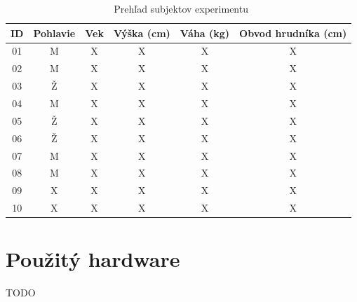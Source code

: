 \begin{table}[H]\centering
\caption[Prehľad subjektov experimentu]{~Prehľad subjektov experimentu}\label{tab:subjects}
    \begin{tabular}{c|c|c|c|c|c}
    	\textbf{ID} & \textbf{Pohlavie} & \textbf{Vek} & \textbf{Výška (cm)} & \textbf{Váha (kg)} & \textbf{Obvod hrudníka (cm)} \tabularnewline \hline 
     	01        	          &  M                & X            & X                   & X                  & X                            \tabularnewline \hline
        02        	          &  M                & X            & X                   & X                  & X                            \tabularnewline \hline
        03        	          &  Ž                & X            & X                   & X                  & X                            \tabularnewline \hline
        04        	          &  M                & X            & X                   & X                  & X                            \tabularnewline \hline
        05        	          &  Ž                & X            & X                   & X                  & X                            \tabularnewline \hline
        06        	          &  Ž                & X            & X                   & X                  & X                            \tabularnewline \hline
        07        	          &  M                & X            & X                   & X                  & X                            \tabularnewline \hline
        08        	          &  M                & X            & X                   & X                  & X                            \tabularnewline \hline
        09        	          &  X                & X            & X                   & X                  & X                            \tabularnewline \hline
        10        	          &  X                & X            & X                   & X                  & X                            \tabularnewline
    \end{tabular}
\end{table}


\section{Použitý hardware}

TODO    


